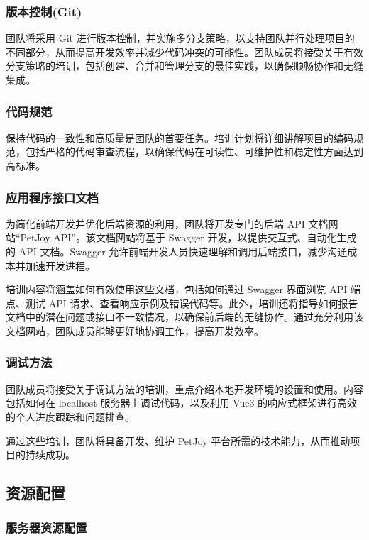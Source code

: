 \subsubsection{版本控制(Git)}

团队将采用 Git 进行版本控制，并实施多分支策略，以支持团队并行处理项目的不同部分，从而提高开发效率并减少代码冲突的可能性。团队成员将接受关于有效分支策略的培训，包括创建、合并和管理分支的最佳实践，以确保顺畅协作和无缝集成。

\subsubsection{代码规范}

保持代码的一致性和高质量是团队的首要任务。培训计划将详细讲解项目的编码规范，包括严格的代码审查流程，以确保代码在可读性、可维护性和稳定性方面达到高标准。

\subsubsection{应用程序接口文档}

为简化前端开发并优化后端资源的利用，团队将开发专门的后端 API 文档网站“PetJoy API”。该文档网站将基于 Swagger 开发，以提供交互式、自动化生成的 API 文档。Swagger 允许前端开发人员快速理解和调用后端接口，减少沟通成本并加速开发进程。

培训内容将涵盖如何有效使用这些文档，包括如何通过 Swagger 界面浏览 API 端点、测试 API 请求、查看响应示例及错误代码等。此外，培训还将指导如何报告文档中的潜在问题或接口不一致情况，以确保前后端的无缝协作。通过充分利用该文档网站，团队成员能够更好地协调工作，提高开发效率。

\subsubsection{调试方法}

团队成员将接受关于调试方法的培训，重点介绍本地开发环境的设置和使用。内容包括如何在 localhost 服务器上调试代码，以及利用 Vue3 的响应式框架进行高效的个人进度跟踪和问题排查。

通过这些培训，团队将具备开发、维护 PetJoy 平台所需的技术能力，从而推动项目的持续成功。

\subsection{资源配置}

\subsubsection{服务器资源配置}

